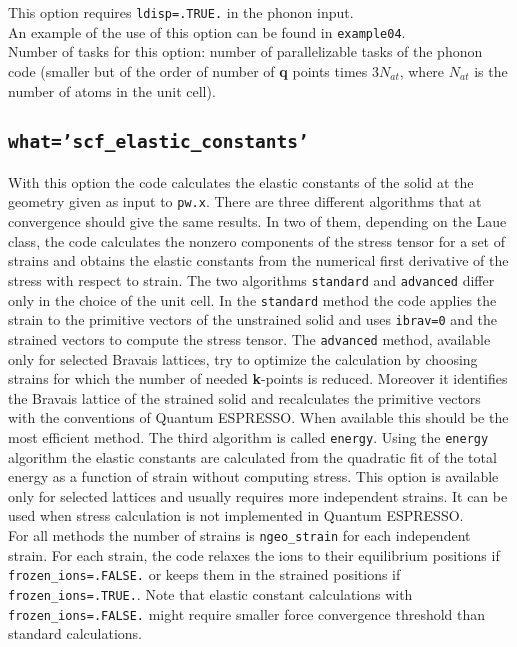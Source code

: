 \documentclass[12pt,a4paper]{article}
\def\qe{{\sc Quantum ESPRESSO}}
\begin{document}
This option requires \texttt{ldisp=.TRUE.} in the phonon input. \\
An example of the use of this option can be found in \texttt{example04}. \\
Number of tasks for this option: number of parallelizable tasks of the 
phonon code (smaller but of the order of number of {\bf q} points times 
$3 N_{at}$, where $N_{at}$ is the number of atoms in the unit cell).

\subsection{\color{web-blue}\texttt{what='scf\_elastic\_constants'}}
With this option the code calculates the elastic constants of the solid
at the geometry given as input to \texttt{pw.x}. 
There are three different algorithms that at convergence should give the
same results. In two of them, depending on the Laue class, the code 
calculates the nonzero components of the stress tensor for a set of strains
and obtains the elastic constants from the numerical first derivative
of the stress with respect to strain.
The two algorithms \texttt{standard} and \texttt{advanced} differ
only in the choice of the unit cell. In the \texttt{standard} method the
code applies the strain to the primitive vectors of the unstrained solid
and uses \texttt{ibrav=0} and the strained vectors to compute the stress
tensor.
The \texttt{advanced}  method, available only for selected Bravais lattices, 
try to optimize the calculation by choosing strains for which the number
of needed {\bf k}-points is reduced. Moreover it identifies the 
Bravais lattice of the strained solid and recalculates the primitive
vectors with the conventions of \qe. When available this should be the
most efficient method.
The third algorithm is called \texttt{energy}.
Using the \texttt{energy} algorithm the elastic constants are calculated 
from the quadratic fit of the total energy as a function of strain
without computing stress. This option is available only for selected 
lattices and usually requires more independent strains. It can be
used when stress calculation is not implemented in \qe.\\
For all methods the number of strains is \texttt{ngeo\_strain}
for each independent strain. 
For each strain, the code relaxes the ions to their equilibrium 
positions if \texttt{frozen\_ions=.FALSE.} or keeps them
in the strained positions if \texttt{frozen\_ions=.TRUE.}. 
Note that elastic constant calculations with \texttt{frozen\_ions=.FALSE.}
might require smaller force convergence threshold than standard calculations. 
\end{document}
